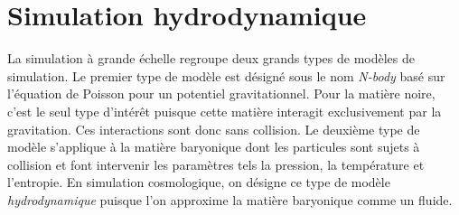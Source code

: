 \documentclass{article}
\begin{document}











\section{ Simulation hydrodynamique}

La simulation à grande échelle regroupe deux grands types de modèles de simulation. Le premier type de modèle est désigné sous le nom \textit{N-body} basé sur l'équation de Poisson pour un potentiel gravitationnel. Pour la matière noire, c'est le seul type d'intérêt puisque cette matière interagit exclusivement par la gravitation. Ces interactions sont donc sans collision. Le deuxième type de modèle s'applique à la matière baryonique dont les particules sont sujets à collision et font intervenir les paramètres tels la pression, la température et l'entropie. En simulation cosmologique, on désigne ce type de modèle \textit{hydrodynamique} puisque l'on approxime la matière baryonique comme un fluide.
\end{document}
